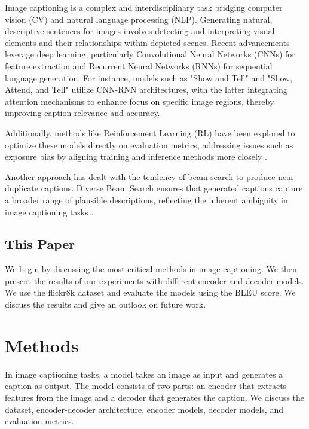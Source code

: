 \documentclass[12pt]{article}
\theoremstyle{plain}
\theoremstyle{definition}
\theoremstyle{remark}
\begin{document}
Image captioning is a complex and interdisciplinary task bridging computer vision (CV) and natural language processing (NLP). Generating natural, descriptive sentences for images involves detecting and interpreting visual elements and their relationships within depicted scenes. Recent advancements leverage deep learning, particularly Convolutional Neural Networks (CNNs) for feature extraction and Recurrent Neural Networks (RNNs) for sequential language generation. For instance, models such as "Show and Tell" \cite{Vinyals:2015} and "Show, Attend, and Tell" \cite{Xu} utilize CNN-RNN architectures, with the latter integrating attention mechanisms to enhance focus on specific image regions, thereby improving caption relevance and accuracy.

Additionally, methods like Reinforcement Learning (RL) have been explored to optimize these models directly on evaluation metrics, addressing issues such as exposure bias by aligning training and inference methods more closely \cite{Rennie}.

Another approach has dealt with the tendency of beam search to produce near-duplicate captions. Diverse Beam Search ensures that generated captions capture a broader range of plausible descriptions, reflecting the inherent ambiguity in image captioning tasks \cite{Vijayakumar}.

\subsection{This Paper}

We begin by discussing the most critical methods in image captioning. We then present the results of our experiments with different encoder and decoder models. We use the flickr8k dataset and evaluate the models using the BLEU score. We discuss the results and give an outlook on future work.


\newpage
\section{Methods}
\label{sec:methods}

In image captioning tasks, a model takes an image as input and generates a caption as output. The model consists of two parts: an encoder that extracts features from the image and a decoder that generates the caption. We discuss the dataset, encoder-decoder architecture, encoder models, decoder models, and evaluation metrics.
\end{document}
